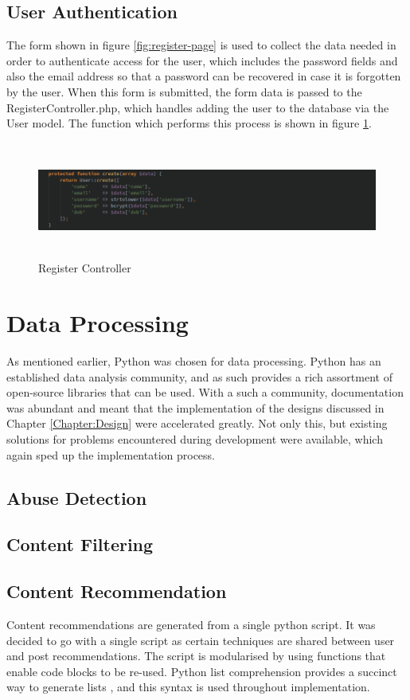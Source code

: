 \subsection{User Authentication}
The form shown in figure \ref{fig:register-page} is used to collect the data needed in order to authenticate access for the user, which includes the password fields and also the email address so that a password can be recovered in case it is forgotten by the user. When this form is submitted, the form data is passed to the RegisterController.php, which handles adding the user to the database via the User model. The function which performs this process is shown in figure \ref{fig:register-controller}.

\begin{figure}[H]
	\centering
	\includegraphics[height=1.5in]{Images/Implementation/register-controller}
	\caption{Register Controller} \label{fig:register-controller}
\end{figure}

\section{Data Processing}
As mentioned earlier, Python was chosen for data processing. Python has an established data analysis community, and as such provides a rich assortment of open-source libraries that can be used. With a such a community, documentation was abundant and meant that the implementation of the designs discussed in Chapter \ref{Chapter:Design} were accelerated greatly. Not only this, but existing solutions for problems encountered during development were available, which again sped up the implementation process. 

\subsection{Abuse Detection}
\subsection{Content Filtering}
\subsection{Content Recommendation}
Content recommendations are generated from a single python script. It was decided to go with a single script as certain techniques are shared between user and post recommendations. The script is modularised by using functions that enable code blocks to be re-used. Python list comprehension provides a succinct way to generate lists \cite{Python:ListComprehension}, and this syntax is used throughout implementation.

